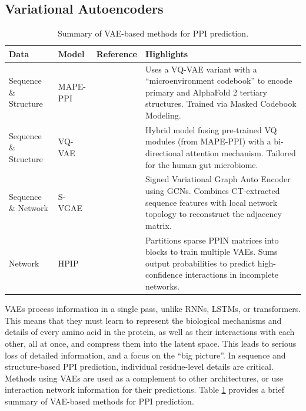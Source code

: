 \documentclass{article}
\begin{document}
\subsection{Variational Autoencoders}
\begin{table}[htbp]
    \centering
    \caption{Summary of VAE-based methods for PPI prediction.}
    \label{tab:vae_methods}
    \renewcommand{\arraystretch}{1.3} 
    \begin{tabularx}{\textwidth}{@{} >{\raggedright\arraybackslash}p{2.5cm} l l X@{}}
        \toprule
        \textbf{Data} & \textbf{Model} & \textbf{Reference} & \textbf{Highlights} \\
        \midrule
        
        Sequence \& Structure & MAPE-PPI & \citet{wu_mape-ppi_2024} & Uses a VQ-VAE variant with a ``microenvironment codebook'' to encode primary and AlphaFold 2 tertiary structures. Trained via Masked Codebook Modeling. \\ 
        \addlinespace
        
        Sequence \& Structure & VQ-VAE & \citet{kiouri_structure-based_gut_2025} & Hybrid model fusing pre-trained VQ modules (from MAPE-PPI) with a bi-directional attention mechanism. Tailored for the human gut microbiome. \\
        \midrule
        
        Sequence \& Network & S-VGAE & \citet{yang_graph-based_2020} & Signed Variational Graph Auto Encoder using GCNs. Combines CT-extracted sequence features with local network topology to reconstruct the adjacency matrix. \\ 
        \addlinespace
        
        Network & HPIP & \citet{xiao_highly-confident_2021} & Partitions sparse PPIN matrices into blocks to train multiple VAEs. Sums output probabilities to predict high-confidence interactions in incomplete networks. \\
        
        \bottomrule
    \end{tabularx}
\end{table}

VAEs process information in a single pass, unlike RNNs, LSTMs, or transformers. This means that they must learn to represent the biological mechanisms and details of every amino acid in the protein, as well as their interactions with each other, all at once, and compress them into the latent space. This leads to serious loss of detailed information, and a focus on the ``big picture''. In sequence and structure-based PPI prediction, individual residue-level details are critical. Methods using VAEs are used as a complement to other architectures, or use interaction network information for their predictions. Table \ref{tab:vae_methods} provides a brief summary of VAE-based methods for PPI prediction.
\end{document}
